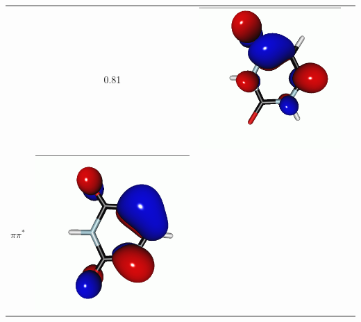 \documentclass[journal=jctcce,manuscript=article]{achemso}
\begin{document}
\begin{table}[H]
\begin{tabular}{ c | c c c }
\begin{minipage}{0.2\textwidth}
    \end{minipage}
    & 0.81
    &  \begin{minipage}{0.2\textwidth}
        \centering
        \includegraphics[scale=0.10]{NTO/Uracil/S0toS1p.png}
    \end{minipage}
    \\
$\pi \pi^*$ &  
    \begin{minipage}{0.2\textwidth}
        \centering
        \includegraphics[scale=0.10]{NTO/Uracil/S0toS2h.png}

\end{minipage}
\end{tabular}
\end{table}
\end{document}
